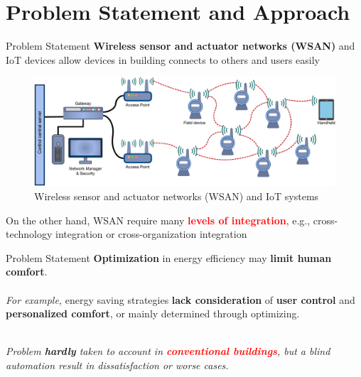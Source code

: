 \documentclass[aspectratio=169]{beamer}
\begin{document}




\section{Problem Statement and Approach}
\begin{frame}{Problem Statement}
\textbf{Wireless sensor and actuator networks (WSAN)} and IoT devices allow devices in building connects to others and users easily
\begin{figure}
    \includegraphics[scale=0.15]{pic/wsan.png}
    \caption{Wireless sensor and actuator networks (WSAN) and IoT systems}
\end{figure}
On the other hand, WSAN require many \textbf{\textcolor{red}{levels of integration}}, e.g., cross-technology integration or cross-organization integration
\end{frame}

\begin{frame}{Problem Statement}
    \textbf{Optimization} in energy efficiency may \textbf{limit human comfort}.\\~\\
    \textit{For example,} energy saving strategies \textbf{lack consideration} of \textbf{user control} and \textbf{personalized comfort}, or mainly determined through optimizing.\\~\\
    \begin{block}{}
        \textit{Problem \textbf{hardly} taken to account in \textbf{\textcolor{red}{conventional buildings}}, but a blind automation result in dissatisfaction or worse cases.}
    \end{block}
\end{frame}
\end{document}
